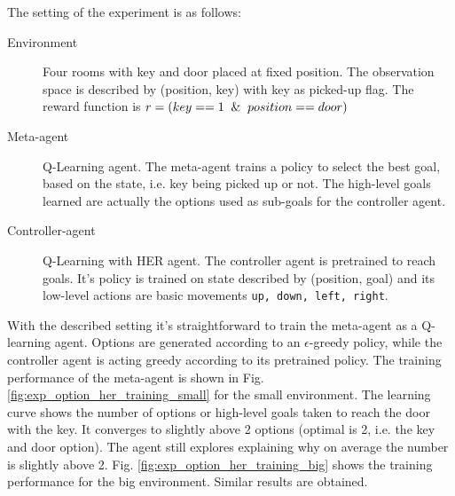 \documentclass[conference]{IEEEtran}
\begin{document}
The setting of the experiment is as follows:
\begin{description}
\item[Environment] Four rooms with key and door placed at fixed position. The observation space is described by (position, key) with key as picked-up flag. The reward function is $r = (key==1 \And position==door)$
\item[Meta-agent] Q-Learning agent. The meta-agent trains a policy to select the best goal, based on the state, i.e. key being picked up or not. The high-level goals learned are actually the options used as sub-goals for the controller agent. 
\item[Controller-agent] Q-Learning with HER agent. The controller agent is pretrained to reach goals. It's policy is trained on state described by (position, goal) and its low-level actions are basic movements \texttt{up, down, left, right}.
\end{description}

With the described setting it's straightforward to train the meta-agent as a Q-learning agent. Options are generated according to an $\epsilon$-greedy policy, while the controller agent is acting greedy according to its pretrained policy. The training performance of the meta-agent is shown in Fig. \ref{fig:exp_option_her_training_small} for the small environment.  The learning curve shows the number of options or high-level goals taken to reach the door with the key. It converges to slightly above 2 options (optimal is 2, i.e. the key and door option). The agent still explores explaining why on average the number is slightly above 2. Fig. \ref{fig:exp_option_her_training_big} shows the training performance for the big environment. Similar results are obtained.
\end{document}

